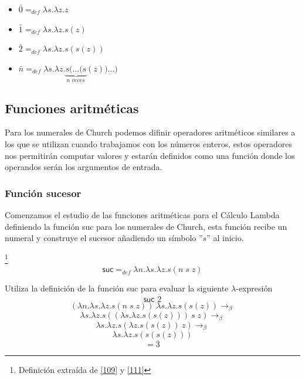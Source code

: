     \begin{itemize}
        \item $\bar{0}=_{def}\lambda s.\lambda z.z$
        \item $\bar{1}=_{def}\lambda s.\lambda z.s(z)$
        \item $\bar{2}=_{def}\lambda s.\lambda z.s(s(z))$
        \item $\bar{n}=_{def}\lambda s.\lambda z.\underbrace{s(\ldots(s}_{n\;veces} (z))\ldots)$
    \end{itemize}

    \subsection{Funciones aritméticas}
		Para los numerales de Church podemos difinir operadores aritméticos similares a los que se utilizan cuando trabajamos con los números enteros, estos operadores nos permitirán computar valores y estarán definidos como una función donde los operandos serán los argumentos de entrada.

    \subsubsection{Función sucesor}
        Comenzamos el estudio de las funciones aritméticas para el Cálculo Lambda definiendo la función \textsf{suc} para los numerales de Church, esta función recibe un numeral y construye el sucesor añadiendo un símbolo ''$s$'' al inicio.
        \begin{definition}\footnote{Definición extraída de \hyperlink{109}{[109]} y  \hyperlink{111}{[111]}}
            $$\textsf{suc} =_{def} \lambda n.\lambda s.\lambda z. s(n \; s \; z)$$
        \end{definition}
     
        \begin{exercise}
            Utiliza la definición de la función \textsf{suc} para evaluar la siguiente  $\lambda$-expresión
            \[
                \textsf{suc } \overline{2}
            \]
            \[
                (\lambda n.\lambda s.\lambda z.s(n \; s \; z) ) \; \lambda s.\lambda z.s(s(z)) \rightarrow_\beta 
            \]
		\[
			\lambda s.\lambda z.s((\lambda s.\lambda z.s(s(z)))\ s \; z) \rightarrow_\beta 
		\]	
            \[
                 \lambda s.\lambda z.s(\lambda z.s(s(z))\ z) \rightarrow_\beta
            \]
		\[
			\lambda s.\lambda z.s(s(s(z)))
		\]
            \[
                = \overline{3}
            \]
        \end{exercise}

